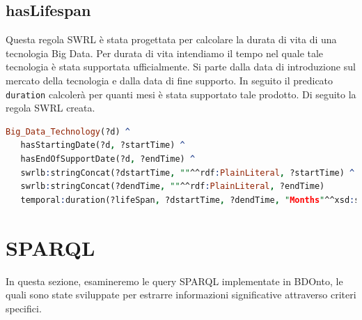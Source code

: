 \subsection{hasLifespan} \label{subsec:haslifespan}
Questa regola SWRL è stata progettata per calcolare la durata di vita di una tecnologia Big Data. Per durata di vita intendiamo il tempo nel quale tale tecnologia è stata supportata ufficialmente. Si parte dalla data di introduzione sul mercato della tecnologia e dalla data di fine supporto. In seguito il predicato \texttt{duration} calcolerà per quanti mesi è stata supportato tale prodotto. Di seguito la regola SWRL creata.\\

\begin{lstlisting}[language=Prolog]
Big_Data_Technology(?d) ^ 
   hasStartingDate(?d, ?startTime) ^ 
   hasEndOfSupportDate(?d, ?endTime) ^ 
   swrlb:stringConcat(?dstartTime, ""^^rdf:PlainLiteral, ?startTime) ^
   swrlb:stringConcat(?dendTime, ""^^rdf:PlainLiteral, ?endTime)
   temporal:duration(?lifeSpan, ?dstartTime, ?dendTime, "Months"^^xsd:string) -> hasLifespan(?d, ?lifeSpan)
\end{lstlisting}
\newpage

\section{SPARQL}\label{sec:sparql}
In questa sezione, esamineremo le query SPARQL implementate in BDOnto, le quali sono state sviluppate per estrarre informazioni significative attraverso criteri specifici.\\

